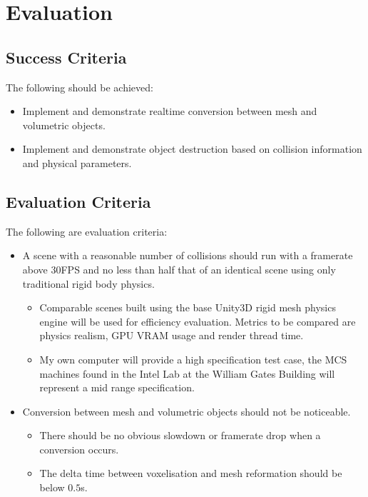 
\section{Evaluation}

\subsection{Success Criteria}

The following should be achieved:

\begin{itemize}

\item Implement and demonstrate realtime conversion between mesh and volumetric objects.

\item Implement and demonstrate object destruction based on collision information and physical parameters. 

\end{itemize}

\subsection{Evaluation Criteria}

The following are evaluation criteria:

\begin{itemize}

\item A scene with a reasonable number of collisions should run with a framerate above 30FPS and no less than half that of an identical scene using only traditional rigid body physics.
	\begin{itemize}
	\item Comparable scenes built using the base Unity3D rigid mesh physics engine will be used for efficiency evaluation. Metrics to be compared are physics realism, GPU VRAM usage and render thread time.
	\item My own computer will provide a high specification test case, the MCS machines found in the Intel Lab at the William Gates Building will represent a mid range specification.
	\end{itemize}

\item Conversion between mesh and volumetric objects should not be noticeable.
	\begin{itemize}
	\item There should be no obvious slowdown or framerate drop when a conversion occurs.
	\item The delta time between voxelisation and mesh reformation should be below $0.5$s.
	\end{itemize}

\end{itemize}

